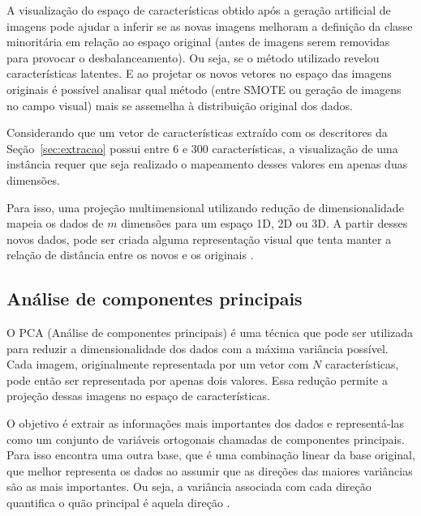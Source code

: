 
A visualização do espaço de características obtido após a geração artificial de imagens pode ajudar a inferir se as novas imagens melhoram a definição da classe minoritária em relação ao espaço original (antes de imagens serem removidas para provocar o desbalanceamento). Ou seja, se o método utilizado revelou características latentes. E ao projetar os novos vetores no espaço das imagens originais é possível analisar qual método (entre SMOTE ou geração de imagens no campo visual) mais se assemelha à distribuição original dos dados.

Considerando que um vetor de características extraído com os descritores da Seção~\ref{sec:extracao} possui entre 6 e 300 características, a visualização de uma instância requer que seja realizado o mapeamento desses valores em apenas duas dimensões.

Para isso, uma projeção multimensional utilizando redução de dimensionalidade mapeia os dados de $m$ dimensões para um espaço 1D, 2D ou 3D. A partir desses novos dados, pode ser criada alguma representação visual que tenta manter a relação de distância entre os novos e os originais \cite{paulovich}.

\subsection{Análise de componentes principais}
\label{subsec:pca}


O PCA (Análise de componentes principais) é uma técnica que pode ser utilizada para reduzir a dimensionalidade dos dados com a máxima variância possível. Cada imagem, originalmente representada por um vetor com $N$ características, pode então ser representada por apenas dois valores. Essa redução permite a projeção dessas imagens no espaço de características.

O objetivo é extrair as informações mais importantes dos dados e representá-las como um conjunto de variáveis ortogonais chamadas de componentes principais.
Para isso encontra uma outra base, que é uma combinação linear da base original, que melhor representa os dados ao assumir que as direções das maiores variâncias são as mais importantes. Ou seja, a variância associada com cada direção quantifica o quão principal é aquela direção \cite{Abdi2010}.

